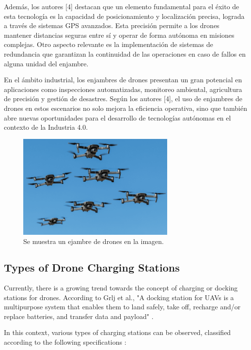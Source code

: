 Además, los autores [4] destacan que un elemento fundamental para el éxito de esta tecnología es la capacidad de posicionamiento y localización precisa, lograda a través de sistemas GPS avanzados. Esta precisión permite a los drones mantener distancias seguras entre sí y operar de forma autónoma en misiones complejas. Otro aspecto relevante es la implementación de sistemas de redundancia que garantizan la continuidad de las operaciones en caso de fallos en alguna unidad del enjambre.

En el ámbito industrial, los enjambres de drones presentan un gran potencial en aplicaciones como inspecciones automatizadas, monitoreo ambiental, agricultura de precisión y gestión de desastres. Según los autores [4], el uso de enjambres de drones en estos escenarios no solo mejora la eficiencia operativa, sino que también abre nuevas oportunidades para el desarrollo de tecnologías autónomas en el contexto de la Industria 4.0.

\begin{figure}
    \centering
    \includegraphics[width=0.7\textwidth]{pictures/swarms.png}
    \caption{Se muestra un ejambre de drones en la imagen. \cite{swarming_drones}}
    \label{fig:swarming_drones_2}
\end{figure}

\subsection{Types of Drone Charging Stations}

    Currently, there is a growing trend towards the concept of charging or docking stations for drones. According to Grlj et al., "A docking station for UAVs is a multipurpose system that enables them to land safely, take off, recharge and/or replace batteries, and transfer data and payload" \cite{grlj_docking_stations}.

    In this context, various types of charging stations can be observed, classified according to the following specifications \cite{grlj_docking_stations}:


